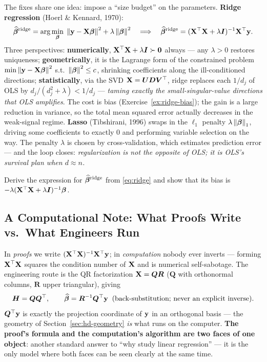 The fixes share one idea: impose a ``size budget'' on the parameters. \textbf{Ridge regression} (Hoerl \& Kennard, 1970)\cite{hoerl1970}:
\begin{equation}\label{eq:ridge}
  \widehat{\bm{\beta}}^{\mathrm{ridge}} = \arg\min_{\bm{\beta}} \; \left\lVert \mathbf{y} - \mathbf{X} \bm{\beta} \right\rVert^2 + \lambda \left\lVert \bm{\beta} \right\rVert^2
  \quad\Longrightarrow\quad
  \widehat{\bm{\beta}}^{\mathrm{ridge}} = (\mathbf{X}^\top \mathbf{X} + \lambda \bm{I})^{-1} \mathbf{X}^\top \mathbf{y} .
\end{equation}
Three perspectives: \textbf{numerically}, $\mathbf{X}^\top\mathbf{X} + \lambda\bm{I} \succ \mathbf{0}$ always — any $\lambda > 0$ restores uniqueness; \textbf{geometrically}, it is the Lagrange form of the constrained problem $\min \left\lVert \mathbf{y} - \mathbf{X}\bm{\beta} \right\rVert^2$ s.t.\ $\left\lVert \bm{\beta} \right\rVert^2 \le c$, shrinking coefficients along the ill-conditioned directions; \textbf{statistically}, via the SVD $\mathbf{X} = \bm{U}\bm{D}\bm{V}^\top$, ridge replaces each $1/d_j$ of OLS by $d_j/(d_j^2 + \lambda) < 1/d_j$ — \textit{taming exactly the small-singular-value directions that OLS amplifies}. The cost is bias (Exercise~\ref{ex:ridge-bias}); the gain is a large reduction in variance, so the total mean squared error actually decreases in the weak-signal regime. \textbf{Lasso} (Tibshirani, 1996) swaps in the $\ell_1$ penalty $\lambda\left\lVert \bm{\beta} \right\rVert_1$, driving some coefficients to exactly $0$ and performing variable selection on the way\cite{tibshirani1996}. The penalty $\lambda$ is chosen by cross-validation, which estimates prediction error — and the loop closes: \textit{regularization is not the opposite of OLS; it is OLS's survival plan when $d \approx n$.}

\begin{exercise}\label{ex:ridge-bias}
Derive the expression for $\widehat{\bm{\beta}}^{\mathrm{ridge}}$ from \eqref{eq:ridge} and show that its bias is $-\lambda(\mathbf{X}^\top\mathbf{X} + \lambda\bm{I})^{-1}\bm{\beta}$.
\end{exercise}

\subsection{A Computational Note: What Proofs Write vs.\ What Engineers Run}\label{sec:hd-compute}

In \textit{proofs} we write $(\mathbf{X}^\top\mathbf{X})^{-1}\mathbf{X}^\top\mathbf{y}$; in \textit{computation} nobody ever inverts — forming $\mathbf{X}^\top\mathbf{X}$ squares the condition number of $\mathbf{X}$ and is numerical self-sabotage. The engineering route is the QR factorization $\mathbf{X} = \bm{Q}\bm{R}$ ($\bm{Q}$ with orthonormal columns, $\bm{R}$ upper triangular), giving
\[
  \bm{H} = \bm{Q}\bm{Q}^\top,
  \qquad
  \widehat{\bm{\beta}} = \bm{R}^{-1}\bm{Q}^\top \mathbf{y} \;\;(\text{back-substitution; never an explicit inverse}).
\]
$\bm{Q}^\top\mathbf{y}$ is exactly the projection coordinate of $\mathbf{y}$ in an orthogonal basis — the geometry of Section~\ref{sec:hd-geometry} \emph{is} what runs on the computer. \textbf{The proof's formula and the computation's algorithm are two faces of one object}: another standard answer to ``why study linear regression'' — it is the only model where both faces can be seen clearly at the same time.

